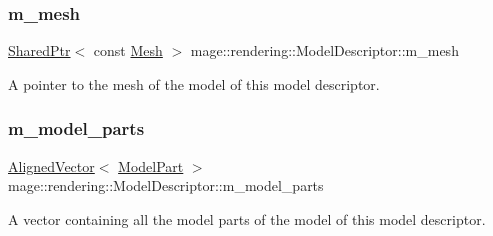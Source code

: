 \subsubsection{\texorpdfstring{m\+\_\+mesh}{m\_mesh}}
{\footnotesize\ttfamily \mbox{\hyperlink{namespacemage_a1e01ae66713838a7a67d30e44c67703e}{Shared\+Ptr}}$<$ const \mbox{\hyperlink{classmage_1_1rendering_1_1_mesh}{Mesh}} $>$ mage\+::rendering\+::\+Model\+Descriptor\+::m\+\_\+mesh\hspace{0.3cm}{\ttfamily [private]}}

A pointer to the mesh of the model of this model descriptor. \mbox{\label{classmage_1_1rendering_1_1_model_descriptor_a2c2eda62e6f2c7f6274a0f829b6abfa1}} 
\subsubsection{\texorpdfstring{m\+\_\+model\+\_\+parts}{m\_model\_parts}}
{\footnotesize\ttfamily \mbox{\hyperlink{namespacemage_a8664bfb5ce2179fc64eae9f82c8a5ba8}{Aligned\+Vector}}$<$ \mbox{\hyperlink{structmage_1_1rendering_1_1_model_part}{Model\+Part}} $>$ mage\+::rendering\+::\+Model\+Descriptor\+::m\+\_\+model\+\_\+parts\hspace{0.3cm}{\ttfamily [private]}}

A vector containing all the model parts of the model of this model descriptor. 
